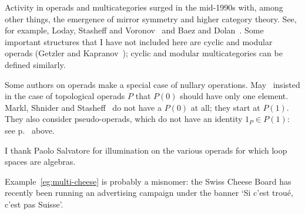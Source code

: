 \begin{notes}
Activity in operads and multicategories surged in the mid-1990s with, among
other things, the emergence of mirror symmetry and higher category theory.
See, for example, Loday, Stasheff and Voronov~\cite{Ren} and Baez and
Dolan~\cite{BDHDA3}.  Some important structures that I have not included
here are cyclic%
%
%
and modular%
%
%
operads (Getzler%
%
%
and
Kapranov~\cite{GeKaCOC, GeKaMO});%
%
%
cyclic and modular multicategories can be
defined similarly.

Some authors on operads make a special case of nullary%
%
%
operations.
May~\cite[1.1]{MayGIL} insisted in the case of topological operads $P$ that
$P(0)$ should have only one element.  Markl, Shnider and
Stasheff~\cite{MSS} do not have a $P(0)$ at all; they start at $P(1)$.
They also consider pseudo-operads,%
%
%
%
%
which do not have an identity $1_P \in
P(1)$: see p.~\pageref{p:pseudo-operads} above.  

I thank Paolo Salvatore for illumination on the various operads for which
loop spaces are algebras.

Example~\ref{eg:multi-cheese} is probably a misnomer: the Swiss%
%
%
%
%
Cheese
Board has recently been running an advertising campaign under the banner
`Si c'est trou\'e, c'est pas Suisse'.









\end{notes}
